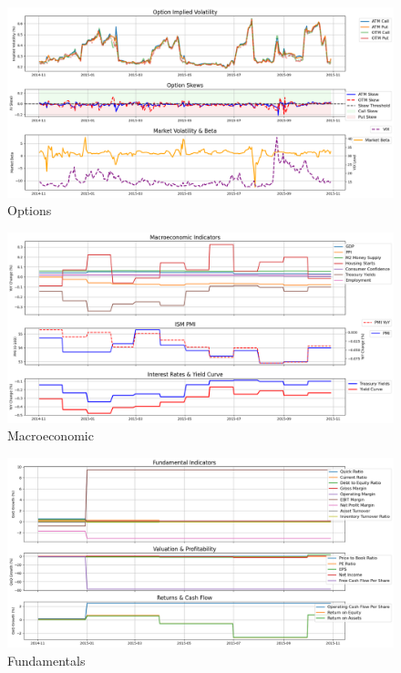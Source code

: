 \documentclass[8pt]{scrartcl}
\begin{document}
\begin{figure}[H]
    \centering
    \includegraphics[width=1\linewidth]{judge_reviews/AMZN_M_gpt-4o-mini/2015-11-01/judge_Option_Implied_Volatility.png}
    \caption{Options}
\end{figure}

\begin{figure}[H]
    \centering
    \includegraphics[width=1\linewidth]{judge_reviews/AMZN_M_gpt-4o-mini/2015-11-01/judge_Macroeconomic_Indicators.png}
    \caption{Macroeconomic}
\end{figure}

\begin{figure}[H]
    \centering
    \includegraphics[width=1\linewidth]{judge_reviews/AMZN_M_gpt-4o-mini/2015-11-01/judge_Fundamental_Indicators.png}
    \caption{Fundamentals}
\end{figure}
\end{document}
